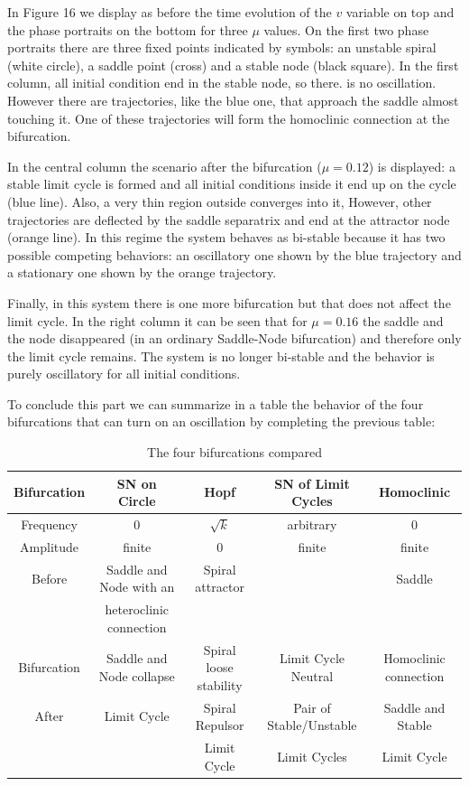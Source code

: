 \documentclass{article}
\begin{document}
In Figure 16 we display as before the time evolution of the $v$ variable on top and the phase portraits on the bottom for three $\mu$ values. 
On the first two phase portraits there are three fixed points indicated by symbols: an unstable spiral (white circle), a saddle point (cross) and a stable node (black square). 
In the first column, all initial condition end in the stable node, so there. is no oscillation. 
However there are trajectories, like the blue one, that approach the saddle almost touching it. 
One of these trajectories will form the homoclinic connection at the bifurcation. 




In the central column the scenario after the bifurcation ($\mu=0.12$) is displayed: a stable limit cycle is formed and all initial conditions inside it end up on the cycle (blue line). 
Also, a very thin region outside converges into it, 
However, other trajectories are deflected by the saddle separatrix and end at the attractor node (orange line). 
In this regime the system behaves as bi-stable because it has two possible competing behaviors: an oscillatory one shown by the blue trajectory and a stationary one shown by the orange trajectory.

Finally, in this system there is one more bifurcation but that does not affect the limit cycle. 
In the right column it can be seen that for $\mu=0.16$ the saddle and the node disappeared (in an ordinary Saddle-Node bifurcation) and therefore only the limit cycle remains. 
The system is no longer bi-stable and the behavior is purely oscillatory for all initial conditions.

To conclude this part we can summarize in a table the behavior of the four bifurcations that can turn on an oscillation by completing the previous table:

\begin{table}[h!]
\begin{center}
\begin{tabular}{ |c|c|c|c|c| }
 \hline
 Bifurcation & SN on Circle & Hopf & SN of Limit Cycles & Homoclinic\\ 
 \hline
 \hline
 Frequency & 0 &  $\sqrt{k}$ & arbitrary & 0\\
 \hline
 Amplitude & finite & 0 & finite & finite \\ 
 \hline
 Before & Saddle and Node with an & Spiral attractor & & Saddle\\ 
 & heteroclinic connection & & &\\
 \hline
 Bifurcation & Saddle and Node collapse & Spiral loose stability & Limit Cycle Neutral & Homoclinic connection\\ 
 \hline
 After & Limit Cycle & Spiral Repulsor & Pair of Stable/Unstable & Saddle and Stable\\
 & & Limit Cycle & Limit Cycles & Limit Cycle\\
 \hline
\end{tabular}
\caption{The four bifurcations compared}
\end{center}
\end{table}
\end{document}
